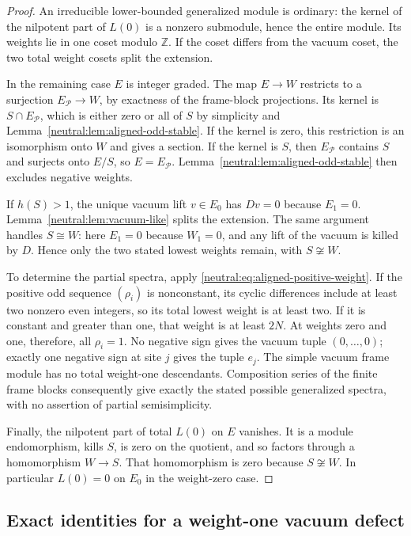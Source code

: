 \documentclass[11pt,a4paper]{article}
\numberwithin{equation}{section}
\theoremstyle{definition}\newtheorem{definition}[theorem]{Definition}
\theoremstyle{remark}\newtheorem{remark}[theorem]{Remark}
\begin{document}
\begin{proof}
An irreducible lower-bounded generalized module is ordinary: the
kernel of the nilpotent part of $L(0)$ is a nonzero submodule, hence
the entire module.  Its weights lie in one coset modulo $\mathbb Z$.
If the coset differs from the vacuum coset, the two total weight
cosets split the extension.

In the remaining case $E$ is integer graded.  The map $E\to W$
restricts to a surjection $E_{\mathscr P}\to W$, by exactness of the
frame-block projections.  Its kernel is $S\cap E_{\mathscr P}$,
which is either zero or all of $S$ by simplicity and
Lemma~\ref{neutral:lem:aligned-odd-stable}.  If the kernel is zero, this restriction is an isomorphism onto $W$
and gives a section.  If the kernel is $S$, then $E_{\mathscr P}$
contains $S$ and surjects onto $E/S$, so $E=E_{\mathscr P}$.
Lemma~\ref{neutral:lem:aligned-odd-stable} then excludes negative
weights.

If $h(S)>1$, the unique vacuum lift $v\in E_0$ has $Dv=0$ because
$E_1=0$.  Lemma~\ref{neutral:lem:vacuum-like} splits the extension.  The same
argument handles $S\cong W$: here $E_1=0$ because $W_1=0$, and any
lift of the vacuum is killed by $D$.  Hence only the two stated
lowest weights remain, with $S\not\cong W$.

To determine the partial spectra, apply
\eqref{neutral:eq:aligned-positive-weight}.  If the
positive odd sequence $(\rho_i)$ is nonconstant, its cyclic differences
include at least two nonzero even integers, so its total lowest weight
is at least two.  If it is constant and greater than one, that weight
is at least $2N$.  At weights zero and one, therefore, all $\rho_i=1$.
No negative sign gives the vacuum tuple $(0,\ldots,0)$; exactly one
negative sign at site $j$ gives the tuple $e_j$.  The simple vacuum
frame module has no total weight-one descendants.  Composition
series of the finite frame blocks consequently give exactly the
stated possible generalized spectra, with no assertion of partial
semisimplicity.

Finally, the nilpotent part of total $L(0)$ on $E$ vanishes.  It is a
module endomorphism, kills $S$, is zero on the quotient, and so factors
through a homomorphism $W\to S$.  That homomorphism is zero because
$S\not\cong W$.  In particular $L(0)=0$ on $E_0$ in the weight-zero
case.
\end{proof}

\subsection{Exact identities for a weight-one vacuum defect}
\end{document}

